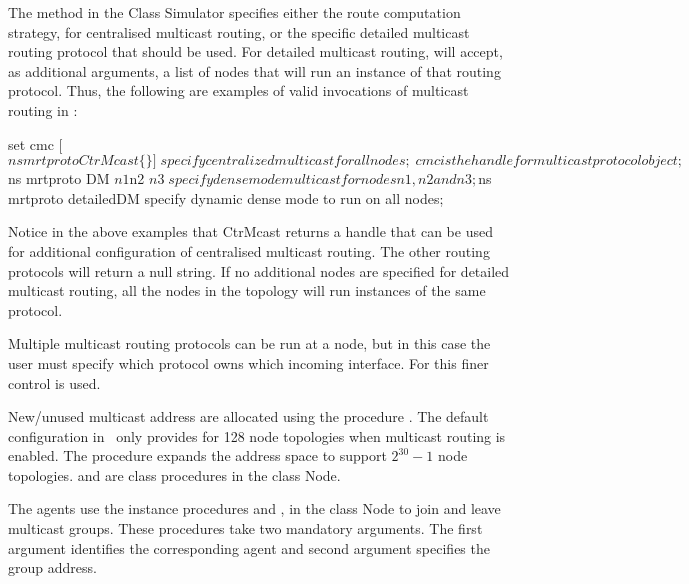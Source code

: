 The method  in the Class Simulator specifies either
the route computation strategy, for centralised multicast routing, or
the specific detailed multicast routing protocol that should be used.
For detailed multicast routing,  will accept, as
additional arguments, a list of nodes that will run an instance of
that routing protocol.  Thus, the following are examples of valid
invocations of multicast routing in \ns:
\begin{program}
        set cmc [$ns mrtproto CtrMcast \{\}]    \; specify centralized multicast for all nodes;
        \; cmc is the handle for multicast protocol object;
        $ns mrtproto DM $n1 $n2 $n3 \; specify dense mode multicast for nodes n1, n2 and n3;
        $ns mrtproto detailedDM                  \; specify dynamic dense mode to run on all nodes;
\end{program}
Notice in the above examples that CtrMcast returns a handle that can
be used for additional configuration of centralised multicast routing.
The other routing protocols will return a null string.  If no
additional nodes are specified for detailed multicast routing, all the
nodes in the topology will run instances of the same protocol.

Multiple multicast routing protocols can be run at a node, but in this
case the user must specify which protocol owns which incoming
interface.  For this finer control  is used.

New/unused multicast address are allocated using the procedure
.
The default configuration in \ns\ only provides for 128 node
topologies when multicast routing is enabled.  The procedure
 expands the address space to support $2^{30} - 1$
node topologies.
 and  are class
procedures in the class Node.

The agents use the instance procedures
 and , in
the class Node to join and leave multicast groups. These procedures
take two mandatory arguments. The first argument identifies the
corresponding agent and second argument specifies the group address.

